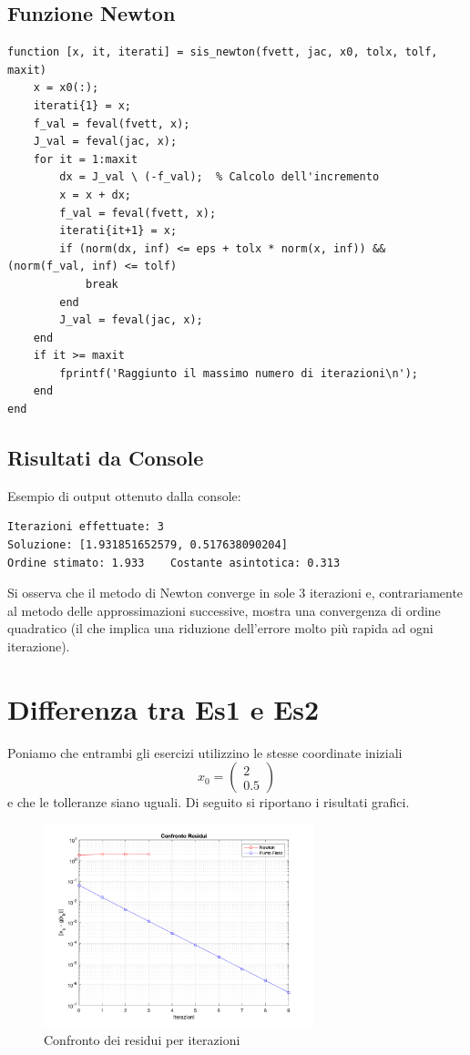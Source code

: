 \documentclass[11pt]{article}
\begin{document}
\subsection*{Funzione Newton}

\begin{lstlisting}
function [x, it, iterati] = sis_newton(fvett, jac, x0, tolx, tolf, maxit)
    x = x0(:);
    iterati{1} = x;
    f_val = feval(fvett, x);
    J_val = feval(jac, x);
    for it = 1:maxit
        dx = J_val \ (-f_val);  % Calcolo dell'incremento
        x = x + dx;
        f_val = feval(fvett, x);
        iterati{it+1} = x;
        if (norm(dx, inf) <= eps + tolx * norm(x, inf)) && (norm(f_val, inf) <= tolf)
            break
        end
        J_val = feval(jac, x);
    end
    if it >= maxit
        fprintf('Raggiunto il massimo numero di iterazioni\n');
    end
end
\end{lstlisting}

\subsection*{Risultati da Console}

Esempio di output ottenuto dalla console:
\begin{lstlisting}[style=console]
Iterazioni effettuate: 3 	 
Soluzione: [1.931851652579, 0.517638090204]
Ordine stimato: 1.933 	 Costante asintotica: 0.313
\end{lstlisting}

Si osserva che il metodo di Newton converge in sole 3 iterazioni e, contrariamente al metodo delle approssimazioni successive, mostra una convergenza di ordine quadratico (il che implica una riduzione dell'errore molto più rapida ad ogni iterazione).

\section*{Differenza tra Es1 e Es2}
Poniamo che entrambi gli esercizi utilizzino le stesse coordinate iniziali
\[
x_0=\begin{pmatrix} 2 \\ 0.5 \end{pmatrix}
\]
e che le tolleranze siano uguali. Di seguito si riportano i risultati grafici.

\begin{figure}[H]
  \centering
  \includegraphics[width=0.7\textwidth]{images/figure1.png} 
  \caption{Confronto dei residui per iterazioni}
  \label{fig:residui}
\end{figure}
\end{document}
